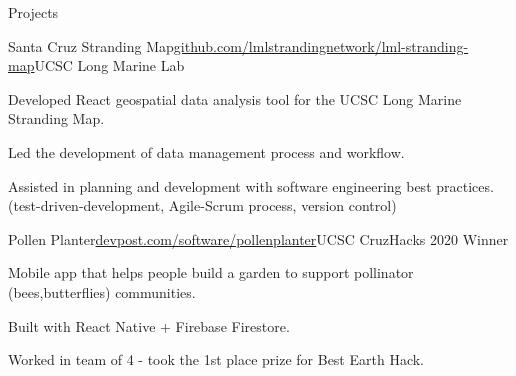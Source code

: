 \documentclass{resume} %
\begin{document}

\begin{rSection}{Projects}
    \begin{rSubsection}{Santa Cruz Stranding Map}{\href{https://github.com/lmlstrandingnetwork/lml-stranding-map}{github.com/lmlstrandingnetwork/lml-stranding-map}}{UCSC Long Marine Lab}{}
        \item Developed React geospatial data analysis tool for the UCSC Long Marine Stranding Map.
        \item Led the development of data management process and workflow.
        \item Assisted in planning and development with software engineering best practices. (test-driven-development, Agile-Scrum process, version control)
    \end{rSubsection}

    \begin{rSubsection}{Pollen Planter}{\href{https://www.devpost.com/software/pollenplanter}{devpost.com/software/pollenplanter}}{UCSC CruzHacks 2020 Winner}{}
        \item Mobile app that helps people build a garden to support pollinator (bees,butterflies) communities.
        \item Built with React Native + Firebase Firestore.
        \item Worked in team of 4 - took the 1st place prize for Best Earth Hack.
    \end{rSubsection}
\end{rSection}





\end{document}
